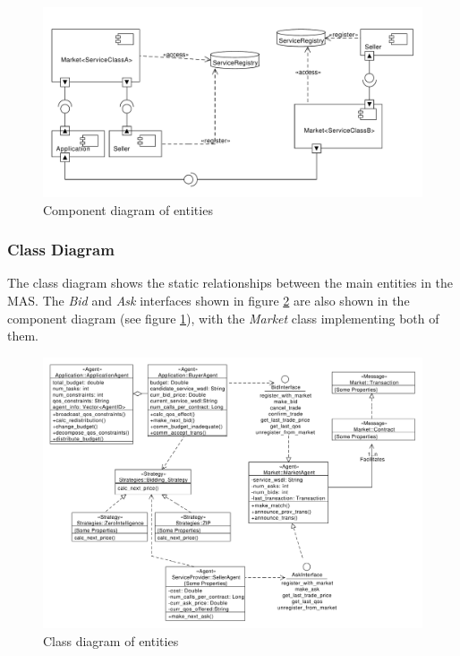 \documentclass[10pt,journal,compsoc]{IEEEtran}
\begin{document}
\begin{figure}[H]
\centering
\includegraphics[scale=0.3]{drawings/Agent_Component_Diagram.pdf}
\caption{Component diagram of entities\label{fig:component_diagram}}
\end{figure}

\subsubsection{Class Diagram} The class diagram shows the static relationships between the main entities in the MAS. The \textit{Bid} and \textit{Ask} interfaces shown in figure \ref{fig:class_diagram} are also shown in the component diagram (see figure \ref{fig:component_diagram}), with the \textit{Market} class implementing both of them. 

\begin{figure}[H]
\centering
\includegraphics[scale=0.25]{drawings/Agent_Class_Diagram.pdf}
\caption{Class diagram of entities \label{fig:class_diagram}}
\end{figure}
\end{document}
